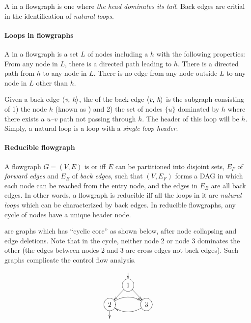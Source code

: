 \documentclass{memo}
\begin{document}
A  in a flowgraph is one where {\em the head dominates its
tail\/}. Back edges are critial in the identification of {\em natural
  loops\/}. 



\paragraph{Loops in flowgraphs}
A  in a flowgraph is a set $L$ of nodes including a
 $h$ with the following properties:
\bit
\w From any node in $L$, there is a directed path leading to $h$.
\w There is a directed path from $h$ to any node in $L$.
\w There is no edge from any node outside $L$ to any node in $L$ other than
$h$. 
\eit

Given a back edge $\mbox{$\langle{\textit{v, h}}\rangle$}$, the  of the back edge
$\mbox{$\langle{\textit{v, h}}\rangle$}$ is the subgraph consisting of 1) the node $h$ (known as ) and 2) the set of nodes $\{u\}$ dominated by $h$ where there exists a
$u$--$v$ path not passing through $h$. The header of this loop will be $h$. 
Simply, a natural loop is a loop with a {\em single loop header\/}. 



\paragraph{Reducible flowgraph}
A flowgraph $G = (V, E)$ is  or  iff 
$E$ can be partitioned into disjoint sets, $E_F$ of {\em forward edges\/} and
$E_B$ of {\em back edges\/}, such that $(V, E_F)$ forms a DAG in which each node
can be reached from the entry node, and the edges in $E_B$ are all back edges. 
In other words, a flowgraph is reducible iff all the loops in it are
{\em natural loops\/} which can be characterized by back edges. 
In reducible flowgraphs, any cycle of nodes have a unique header node. 

 are graphs which has ``cyclic core'' 
as shown below, after node collapsing and edge deletions. Note that in the 
cycle, neither node 2 or node 3 dominates the other (the edges between nodes 2
and 3 are cross edges not back edges). 
Such graphs complicate the control flow analysis.
\[ \xymatrix@-0.5cm{
  & \ar[d] & \\
  &*++[o][F]{1} \ar[rd]\ar[ld] & \\
 *++[o][F]{2} \ar[d] \ar@/^2.5ex/[rr]& & *++[o][F]{3} \ar@/^2.5ex/[ll]  \\
& &
}
\]
\end{document}
